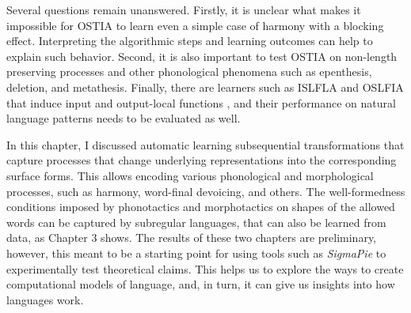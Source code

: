 Several questions remain unanswered.
Firstly, it is unclear what makes it impossible for OSTIA to learn even a simple case of harmony with a blocking effect.
Interpreting the algorithmic steps and learning outcomes can help to explain such behavior.
Second, it is also important to test OSTIA on non-length preserving processes and other phonological phenomena such as epenthesis, deletion, and metathesis.
Finally, there are learners such as ISLFLA and OSLFIA that induce input and output-local functions \citep{ChandleeEtAl2014,ChandleeEtAl2015}, and their performance on natural language patterns needs to be evaluated as well.


In this chapter, I discussed automatic learning subsequential transformations that capture processes that change underlying representations into the corresponding surface forms.
This allows encoding various phonological and morphological processes, such as harmony, word-final devoicing, and others.
The well-formedness conditions imposed by phonotactics and morphotactics on shapes of the allowed words can be captured by subregular languages, that can also be learned from data, as Chapter 3 shows.
The results of these two chapters are preliminary, however, this meant to be a starting point for using tools such as \emph{SigmaPie} to experimentally test theoretical claims.
This helps us to explore the ways to create computational models of language, and, in turn, it can give us insights into how languages work.

